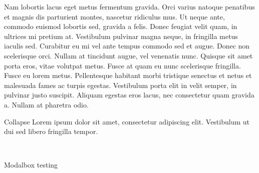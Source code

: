 \documentclass{article}
\begin{document}
Nam lobortis lacus eget metus fermentum gravida. Orci varius natoque penatibus et magnis dis parturient montes, nascetur ridiculus mus. Ut neque ante, commodo euismod lobortis sed, gravida a felis. Donec feugiat velit quam, in ultrices mi pretium at. Vestibulum pulvinar magna neque, in fringilla metus iaculis sed. Curabitur eu mi vel ante tempus commodo sed et augue. Donec non scelerisque orci. Nullam at tincidunt augue, vel venenatis nunc. Quisque sit amet porta eros, vitae volutpat metus. Fusce at quam eu nunc scelerisque fringilla. Fusce eu lorem metus. Pellentesque habitant morbi tristique senectus et netus et malesuada fames ac turpis egestas. Vestibulum porta elit in velit semper, in pulvinar justo suscipit. Aliquam egestas eros lacus, nec consectetur quam gravida a. Nullam at pharetra odio. 

\begin{collapse}{Collapse}
Lorem ipsum dolor sit amet, consectetur adipiscing elit. Vestibulum ut dui sed libero fringilla tempor.  
\end{collapse}\\
\begin{modalbox}{Modalbox}
testing
\end{modalbox}\\
\end{document}
